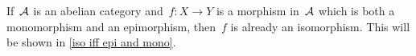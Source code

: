 \begin{remark*}
  If~$\mathcal{A}$ is an abelian category and~$f \colon X \to Y$ is a morphism in~$\mathcal{A}$ which is both a monomorphism and an epimorphism, then~$f$ is already an isomorphism.
  This will be shown in \cref{iso iff epi and mono}.
%   
\end{remark*}


